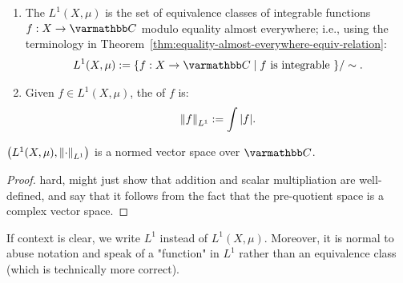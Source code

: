 \begin{definition}
    \phantom{a}
    \begin{enumerate}[label = (\arabic*),itemsep=1pt,topsep=3pt]
        \item The  $L^1(X,\mu)$ is the set of equivalence classes of integrable functions $f:X \rightarrow \bfC$ modulo equality almost everywhere; i.e., using the terminology in Theorem~\ref{thm:equality-almost-everywhere-equiv-relation}:
            \begin{equation*}
            \begin{split}
                L^1(X,\mu) := \{f:X \rightarrow \bfC \mid f \text{ is integrable }\}/\sim.
            \end{split}
            \end{equation*}

        \item Given $f \in L^1(X,\mu)$, the  of $f$ is:
            \begin{equation*}
            \begin{split}
                \left\lVert f \right\rVert_{L^1}:= \int |f|.
            \end{split}
            \end{equation*}
    \end{enumerate}
\end{definition}

\begin{theorem}\label{thm:l1-normed-vector-space}
    $\bigl(L^1(X,\mu), \left\lVert \cdot \right\rVert_{L^1}\bigr)$ is a normed vector space over $\bfC$.
\end{theorem}
    \begin{proof}
        {\color{red} hard, might just show that addition and scalar multipliation are well-defined, and say that it follows from the fact that the pre-quotient space is a complex vector space}.
    \end{proof}

    \begin{remark}
        If context is clear, we write $L^1$ instead of $L^1(X,\mu)$. Moreover, it is normal to abuse notation and speak of a "function" in $L^1$ rather than an equivalence class (which is technically more correct).
    \end{remark}

